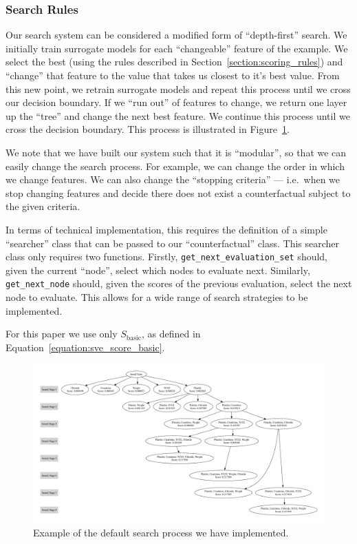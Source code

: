 \documentclass{article}
\begin{document}
\subsubsection{Search Rules~\label{section:search}}
Our search system can be considered a modified form of ``depth-first'' search.
We initially train surrogate models for each ``changeable'' feature of the example. We select the best (using the rules described in Section~\ref{section:scoring_rules}) and ``change'' that feature to the value that takes us closest to it's best value. From this new point, we retrain surrogate models and repeat this process until we cross our decision boundary. If we ``run out'' of features to change, we return one layer up the ``tree'' and change the next best feature. We continue this process until we cross the decision boundary. This process is illustrated in Figure~\ref{figure:search_example}.

We note that we have built our system such that it is ``modular'', so that we can easily change the search process. For example, we can change the order in which we change features. We can also change the ``stopping criteria'' --- i.e.\ when we stop changing features and decide there does not exist a counterfactual subject to the given criteria. 

In terms of technical implementation, this requires the definition of a simple ``searcher'' class that can be passed to our ``counterfactual'' class. This searcher class only requires two functions. Firstly, {\verb|get_next_evaluation_set|} should, given the current ``node'', select which nodes to evaluate next. Similarly, {\verb|get_next_node|} should, given the scores of the previous evaluation, select the next node to evaluate. This allows for a wide range of search strategies to be implemented. 

For this paper we use only \(S_\text{basic}\), as defined in Equation~\ref{equation:sve_score_basic}.

\begin{figure}
    \centering
    \includegraphics[width=\linewidth]{figures/round-table.gv.pdf}
    \caption{Example of the default search process we have implemented.\label{figure:search_example}}
\end{figure}
\end{document}
